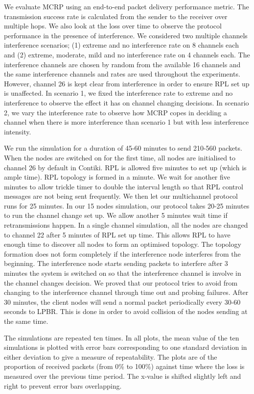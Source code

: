 We evaluate MCRP using an end-to-end packet delivery performance metric. The transmission success rate is calculated from the sender to the receiver over multiple hops. We also look at the loss over time to observe the protocol performance in the presence of interference. We considered two multiple channels interference scenarios; (1) extreme and no interference rate on 8 channels each and (2) extreme, moderate, mild and no interference rate on 4 channels each. The interference channels are chosen by random from the available 16 channels and the same interference channels and rates are used throughout the experiments. However, channel 26 is kept clear from interference in order to ensure RPL set up is unaffected. In scenario 1, we fixed the interference rate to extreme and no interference to observe the effect it has on channel changing decisions. In scenario 2, we vary the interference rate to observe how MCRP copes in deciding a channel when there is more interference than scenario 1 but with less interference intensity. 

We run the simulation for a duration of 45-60 minutes to send 210-560 packets. When the nodes are switched on for the first time, all nodes are initialised to channel 26 by default in Contiki. RPL is allowed five minutes to set up (which is ample time). RPL topology is formed in a minute. We wait for another five minutes to allow trickle timer to double the interval length so that RPL control messages are not being sent frequently. We then let our multichannel protocol runs for 25 minutes. In our 15 nodes simulation, our protocol takes 20-25 minutes to run the channel change set up. We allow another 5 minutes wait time if retransmissions happen. 
In a single channel simulation, all the nodes are changed to channel 22 after 5 minutes of RPL set up time. This allows RPL to have enough time to discover all nodes to form an optimised topology. The topology formation does not form completely if the interference node interferes from the beginning. The interference node starts sending packets to interfere after 3 minutes the system is switched on so that the interference channel is involve in the channel changes decision. We proved that our protocol tries to avoid from changing to the interference channel through time out and probing failures. After 30 minutes, the client nodes will send a normal packet periodically every 30-60 seconds to LPBR. This is done in order to avoid collision of the nodes sending at the same time. 

The simulations are repeated ten times. In all plots, the mean value of the ten simulations is plotted with error bars corresponding to one standard deviation in either deviation to give a measure of repeatability. The plots are of the proportion of received packets (from 0\% to 100\%) against time where the loss is measured over the previous time period.  The x-value is shifted slightly left and right to prevent error bars overlapping.

